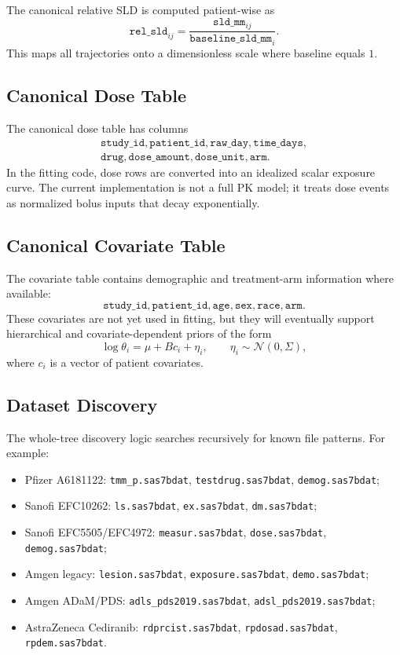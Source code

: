 \documentclass[11pt,a4paper]{article}
\newcommand{\Normal}{\mathcal{N}}
\begin{document}
The canonical relative SLD is computed patient-wise as
\[
    \texttt{rel\_sld}_{ij}
    = \frac{\texttt{sld\_mm}_{ij}}{\texttt{baseline\_sld\_mm}_{i}}.
\]
This maps all trajectories onto a dimensionless scale where baseline equals $1$.

\subsection{Canonical Dose Table}

The canonical dose table has columns
\[
\begin{array}{ll}
\texttt{study\_id}, \texttt{patient\_id}, \texttt{raw\_day}, \texttt{time\_days},\\
\texttt{drug}, \texttt{dose\_amount}, \texttt{dose\_unit}, \texttt{arm}.
\end{array}
\]
In the fitting code, dose rows are converted into an idealized scalar exposure curve. The current implementation is not a full PK model; it treats dose events as normalized bolus inputs that decay exponentially.

\subsection{Canonical Covariate Table}

The covariate table contains demographic and treatment-arm information where available:
\[
    \texttt{study\_id}, \texttt{patient\_id}, \texttt{age}, \texttt{sex}, \texttt{race}, \texttt{arm}.
\]
These covariates are not yet used in fitting, but they will eventually support hierarchical and covariate-dependent priors of the form
\[
    \log \theta_i = \mu + B c_i + \eta_i,
    \qquad
    \eta_i \sim \Normal(0,\Sigma),
\]
where $c_i$ is a vector of patient covariates.

\subsection{Dataset Discovery}

The whole-tree discovery logic searches recursively for known file patterns. For example:
\begin{itemize}[leftmargin=2em]
    \item Pfizer A6181122: \texttt{tmm\_p.sas7bdat}, \texttt{testdrug.sas7bdat}, \texttt{demog.sas7bdat};
    \item Sanofi EFC10262: \texttt{ls.sas7bdat}, \texttt{ex.sas7bdat}, \texttt{dm.sas7bdat};
    \item Sanofi EFC5505/EFC4972: \texttt{measur.sas7bdat}, \texttt{dose.sas7bdat}, \texttt{demog.sas7bdat};
    \item Amgen legacy: \texttt{lesion.sas7bdat}, \texttt{exposure.sas7bdat}, \texttt{demo.sas7bdat};
    \item Amgen ADaM/PDS: \texttt{adls\_pds2019.sas7bdat}, \texttt{adsl\_pds2019.sas7bdat};
    \item AstraZeneca Cediranib: \texttt{rdprcist.sas7bdat}, \texttt{rpdosad.sas7bdat}, \texttt{rpdem.sas7bdat}.
\end{itemize}
\end{document}
